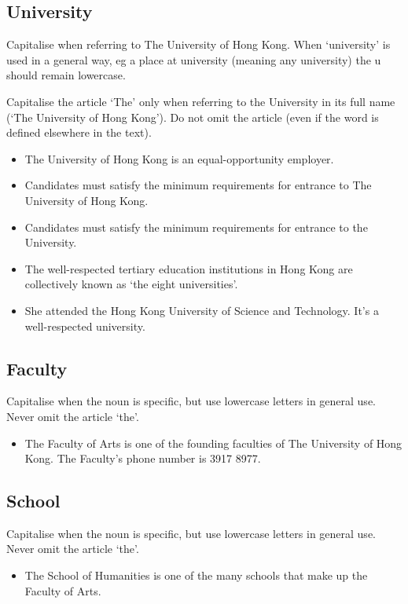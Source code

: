 \documentclass[11pt,a4paper]{book}
\newcommand{\cmark}{{\color{green(html/cssgreen)}\checkmark}}%
\begin{document}
			\subsection{University}
			Capitalise when referring to The University of Hong Kong. When `university' is used in a general way, eg a place at university (meaning any university) the u should remain lowercase.\par
			Capitalise the article `The' only when referring to the University in its full name (`The University of Hong Kong'). Do not omit the article (even if the word is defined elsewhere in the text).
				{\firasans \begin{mdframed}[backgroundcolor=aliceblue] \begin{itemize}[label=\cmark]
					\item The University of Hong Kong is an equal-opportunity employer.
					\item Candidates must satisfy the minimum requirements for entrance to The University of Hong Kong.
					\item Candidates must satisfy the minimum requirements for entrance to the University.
					\item The well-respected tertiary education institutions in Hong Kong are collectively known as `the eight universities'.
					\item She attended the Hong Kong University of Science and Technology. It's a well-respected university.
				\end{itemize} \end{mdframed} }
			\subsection{Faculty}
			Capitalise when the noun is specific, but use lowercase letters in general use. Never omit the article `the'.
				{\firasans \begin{mdframed}[backgroundcolor=aliceblue] \begin{itemize}[label=\cmark]
					\item The Faculty of Arts is one of the founding faculties of The University of Hong Kong. The Faculty's phone number is 3917 8977.
				\end{itemize} \end{mdframed} }
			\subsection{School}
			Capitalise when the noun is specific, but use lowercase letters in general use. Never omit the article `the'.
				{\firasans \begin{mdframed}[backgroundcolor=aliceblue] \begin{itemize}[label=\cmark]
					\item The School of Humanities is one of the many schools that make up the Faculty of Arts.
				\end{itemize} \end{mdframed} }
\end{document}
